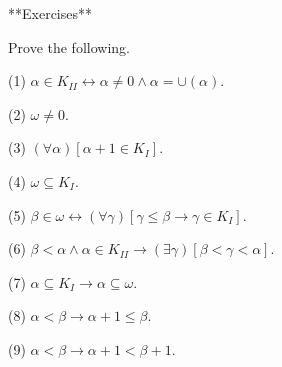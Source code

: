 **Exercises**

Prove the following.

(1) $\alpha \in K_{II} \leftrightarrow \alpha \neq 0 \wedge \alpha = \cup(\alpha)$.

(2) $\omega \neq 0$.

(3) $(\forall \alpha)[\alpha + 1 \in K_I]$.

(4) $\omega \subseteq K_I$.

(5) $\beta \in \omega \leftrightarrow (\forall \gamma)[\gamma \leq \beta \rightarrow \gamma \in K_I]$.

(6) $\beta < \alpha \wedge \alpha \in K_{II} \rightarrow (\exists \gamma)[\beta < \gamma < \alpha]$.

(7) $\alpha \subseteq K_I \rightarrow \alpha \subseteq \omega$.

(8) $\alpha < \beta \rightarrow \alpha + 1 \leq \beta$.

(9) $\alpha < \beta \rightarrow \alpha + 1 < \beta + 1$.
